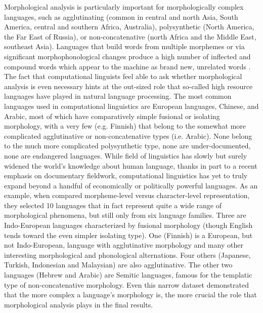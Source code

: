 \documentclass[12pt]{article}
\begin{document}
Morphological analysis is particularly important for morphologically complex languages, such as agglutinating (common in central and north Asia, South America, central and southern Africa, Australia), polysynthetic (North America, the Far East of Russia), or non-concatenative (north Africa and the Middle East, southeast Asia). Languages that build words from multiple morphemes or via significant morphophonological changes produce a high number of inflected and compound words which appear to the machine as brand new, unrelated words \cite{dreyer_discovering_2011,goldsmith_computational_2017,hammarstrom_unsupervised_2011,kann_neural_2016,ruokolainen_supervised_2013}. The fact that computational linguists feel able to ask whether morphological analysis is even necessary hints at the out-sized role that so-called high resource languages have played in natural language processing. The most common languages used in computational linguistics are European languages, Chinese, and Arabic, most of which have comparatively simple fusional or isolating morphology, with a very few (e.g. Finnish) that belong to the somewhat more complicated agglutinative or non-concatenative types (i.e. Arabic). None belong to the much more complicated polysynthetic type, none are under-documented, none are endangered languages. While field of linguistics has slowly but surely widened the world's knowledge about human language, thanks in part to a recent emphasis on documentary fieldwork, computational linguistics has yet to truly expand beyond a handful of economically or politically powerful languages. As an example, when  compared morpheme-level versus character-level representation, they selected 10 languages that in fact represent quite a wide range of morphological phenomena, but still only from six language families. Three are Indo-European languages characterized by fusional morphology (though English tends toward the even simpler isolating type). One (Finnish) is a European, but not Indo-European, language with agglutinative morphology and many other interesting morphological and phonological alternations. Four others (Japanese, Turkish, Indonesian and Malaysian) are also agglutinative. The other two languages (Hebrew and Arabic) are Semitic languages, famous for the templatic type of non-concatenative morphology. Even this narrow dataset demonstrated that the more complex a language’s morphology is, the more crucial the role that morphological analysis plays in the final results. 
 
\end{document}
